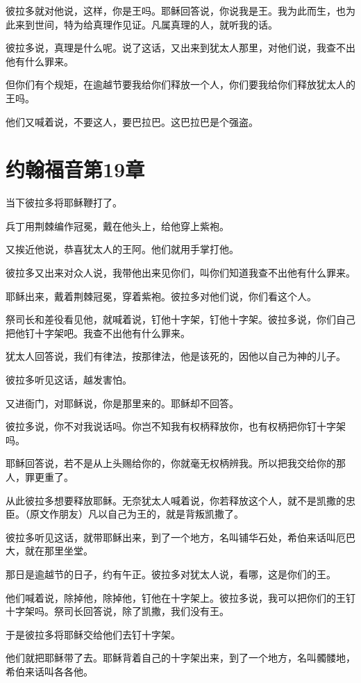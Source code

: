 \documentclass[12pt,oneside]{book}
\begin{document}
彼拉多就对他说，这样，你是王吗。耶稣回答说，你说我是王。我为此而生，也为此来到世间，特为给真理作见证。凡属真理的人，就听我的话。

彼拉多说，真理是什么呢。说了这话，又出来到犹太人那里，对他们说，我查不出他有什么罪来。

但你们有个规矩，在逾越节要我给你们释放一个人，你们要我给你们释放犹太人的王吗。

他们又喊着说，不要这人，要巴拉巴。这巴拉巴是个强盗。

\chapter{约翰福音第19章}
当下彼拉多将耶稣鞭打了。

兵丁用荆棘编作冠冕，戴在他头上，给他穿上紫袍。

又挨近他说，恭喜犹太人的王阿。他们就用手掌打他。

彼拉多又出来对众人说，我带他出来见你们，叫你们知道我查不出他有什么罪来。

耶稣出来，戴着荆棘冠冕，穿着紫袍。彼拉多对他们说，你们看这个人。

祭司长和差役看见他，就喊着说，钉他十字架，钉他十字架。彼拉多说，你们自己把他钉十字架吧。我查不出他有什么罪来。

犹太人回答说，我们有律法，按那律法，他是该死的，因他以自己为神的儿子。

彼拉多听见这话，越发害怕。

又进衙门，对耶稣说，你是那里来的。耶稣却不回答。

彼拉多说，你不对我说话吗。你岂不知我有权柄释放你，也有权柄把你钉十字架吗。

耶稣回答说，若不是从上头赐给你的，你就毫无权柄辨我。所以把我交给你的那人，罪更重了。

从此彼拉多想要释放耶稣。无奈犹太人喊着说，你若释放这个人，就不是凯撒的忠臣。（原文作朋友）凡以自己为王的，就是背叛凯撒了。

彼拉多听见这话，就带耶稣出来，到了一个地方，名叫铺华石处，希伯来话叫厄巴大，就在那里坐堂。

那日是逾越节的日子，约有午正。彼拉多对犹太人说，看哪，这是你们的王。

他们喊着说，除掉他，除掉他，钉他在十字架上。彼拉多说，我可以把你们的王钉十字架吗。祭司长回答说，除了凯撒，我们没有王。

于是彼拉多将耶稣交给他们去钉十字架。

他们就把耶稣带了去。耶稣背着自己的十字架出来，到了一个地方，名叫髑髅地，希伯来话叫各各他。
\end{document}
